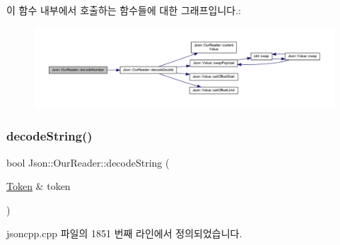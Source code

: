 이 함수 내부에서 호출하는 함수들에 대한 그래프입니다.\+:\nopagebreak
\begin{figure}[H]
\begin{center}
\leavevmode
\includegraphics[width=350pt]{class_json_1_1_our_reader_a712270d53a2f023c2f406ac813548340_cgraph}
\end{center}
\end{figure}
\mbox{\label{class_json_1_1_our_reader_a34e31d8b8399b7ad493359702b6de6c9}} 
\subsubsection{\texorpdfstring{decode\+String()}{decodeString()}\hspace{0.1cm}{\footnotesize\ttfamily [1/2]}}
{\footnotesize\ttfamily bool Json\+::\+Our\+Reader\+::decode\+String (\begin{DoxyParamCaption}\item[{\hyperlink{class_json_1_1_our_reader_1_1_token}{Token} \&}]{token }\end{DoxyParamCaption})\hspace{0.3cm}{\ttfamily [private]}}



jsoncpp.\+cpp 파일의 1851 번째 라인에서 정의되었습니다.


